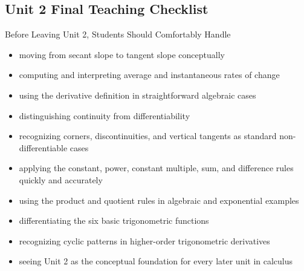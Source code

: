 \documentclass[11pt]{article}
\begin{document}
\newpage
\subsection{Unit 2 Final Teaching Checklist}

\begin{summarybox}{Before Leaving Unit 2, Students Should Comfortably Handle}
\begin{itemize}
    \item moving from secant slope to tangent slope conceptually
    \item computing and interpreting average and instantaneous rates of change
    \item using the derivative definition in straightforward algebraic cases
    \item distinguishing continuity from differentiability
    \item recognizing corners, discontinuities, and vertical tangents as standard non-differentiable cases
    \item applying the constant, power, constant multiple, sum, and difference rules quickly and accurately
    \item using the product and quotient rules in algebraic and exponential examples
    \item differentiating the six basic trigonometric functions
    \item recognizing cyclic patterns in higher-order trigonometric derivatives
    \item seeing Unit 2 as the conceptual foundation for every later unit in calculus
\end{itemize}
\end{summarybox}
\end{document}
